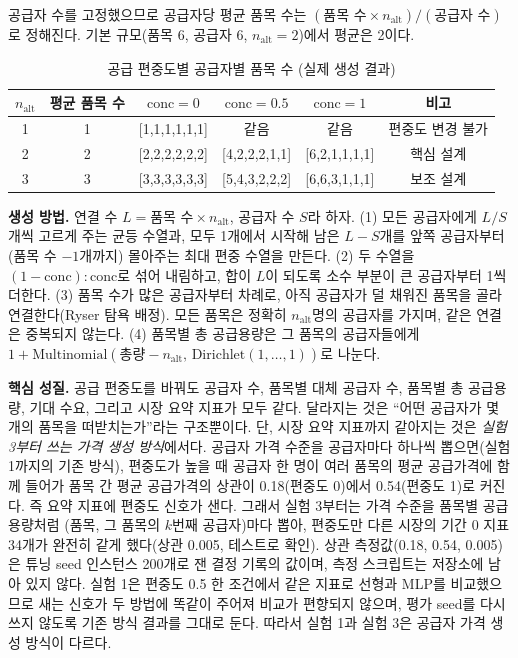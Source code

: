 \documentclass[11pt,a4paper]{article}
\newcommand{\keypoint}[1]{%
  \par\smallskip\noindent\colorbox{boxbg}{\parbox{\dimexpr\linewidth-2\fboxsep}{#1}}\par\smallskip}
\begin{document}
공급자 수를 고정했으므로 공급자당 평균 품목 수는
$(\text{품목 수}\times n_{\mathrm{alt}})/(\text{공급자 수})$로 정해진다.
기본 규모(품목 6, 공급자 6, $n_{\mathrm{alt}}=2$)에서 평균은 2이다.

\begin{table}[H]
\centering\small
\caption{공급 편중도별 공급자별 품목 수 (실제 생성 결과)}
\begin{tabular}{cccccc}
\toprule
$n_{\mathrm{alt}}$ & 평균 품목 수 & $\mathrm{conc}=0$ & $\mathrm{conc}=0.5$ & $\mathrm{conc}=1$ & 비고\\
\midrule
1 & 1 & [1,1,1,1,1,1] & 같음 & 같음 & 편중도 변경 불가\\
2 & 2 & [2,2,2,2,2,2] & [4,2,2,2,1,1] & [6,2,1,1,1,1] & 핵심 설계\\
3 & 3 & [3,3,3,3,3,3] & [5,4,3,2,2,2] & [6,6,3,1,1,1] & 보조 설계\\
\bottomrule
\end{tabular}
\end{table}

\textbf{생성 방법.} 연결 수 $L=\text{품목 수}\times n_{\mathrm{alt}}$, 공급자 수 $S$라 하자.
(1) 모든 공급자에게 $L/S$개씩 고르게 주는 균등 수열과, 모두 1개에서 시작해 남은 $L-S$개를 앞쪽 공급자부터
(품목 수 $-1$개까지) 몰아주는 최대 편중 수열을 만든다. (2) 두 수열을 $(1-\mathrm{conc}):\mathrm{conc}$로 섞어 내림하고,
합이 $L$이 되도록 소수 부분이 큰 공급자부터 1씩 더한다. (3) 품목 수가 많은 공급자부터 차례로,
아직 공급자가 덜 채워진 품목을 골라 연결한다(Ryser 탐욕 배정). 모든 품목은 정확히 $n_{\mathrm{alt}}$명의 공급자를 가지며,
같은 연결은 중복되지 않는다. (4) 품목별 총 공급용량은 그 품목의 공급자들에게 $1+\mathrm{Multinomial}(\text{총량}-n_{\mathrm{alt}},\,\mathrm{Dirichlet}(1,\dots,1))$로 나눈다.

\keypoint{\textbf{핵심 성질.} 공급 편중도를 바꿔도 공급자 수, 품목별 대체 공급자 수,
품목별 총 공급용량, 기대 수요, 그리고 시장 요약 지표가 모두 같다. 달라지는 것은
``어떤 공급자가 몇 개의 품목을 떠받치는가''라는 구조뿐이다.
단, 시장 요약 지표까지 같아지는 것은 \emph{실험 3부터 쓰는 가격 생성 방식}에서다.
공급자 가격 수준을 공급자마다 하나씩 뽑으면(실험 1까지의 기존 방식), 편중도가 높을 때 공급자 한 명이 여러 품목의
평균 공급가격에 함께 들어가 품목 간 평균 공급가격의 상관이 0.18(편중도 0)에서 0.54(편중도 1)로 커진다.
즉 요약 지표에 편중도 신호가 샌다. 그래서 실험 3부터는 가격 수준을 품목별 공급용량처럼
(품목, 그 품목의 $k$번째 공급자)마다 뽑아, 편중도만 다른 시장의 기간 0 지표 34개가 완전히 같게 했다(상관 0.005, 테스트로 확인).
상관 측정값(0.18, 0.54, 0.005)은 튜닝 seed 인스턴스 200개로 잰 결정 기록의 값이며, 측정 스크립트는 저장소에 남아 있지 않다.
실험 1은 편중도 0.5 한 조건에서 같은 지표로 선형과 MLP를 비교했으므로 새는 신호가 두 방법에 똑같이 주어져
비교가 편향되지 않으며, 평가 seed를 다시 쓰지 않도록 기존 방식 결과를 그대로 둔다.
따라서 실험 1과 실험 3은 공급자 가격 생성 방식이 다르다.}
\end{document}
